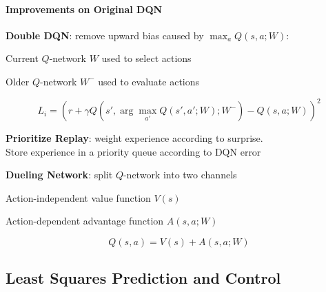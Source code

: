 \documentclass[10pt]{report}
\begin{document}
\paragraph{Improvements on Original DQN}
\begin{list}{}{}
	\item \textbf{Double DQN}: remove upward bias caused by $\max_a Q(s,a;W)$:
	\begin{list}{}{}
		\item Current $Q$-network $W$ used to select actions
		\item Older $Q$-network $W^-$ used to evaluate actions
	\end{list}
	$$L_i = \left(r+\gamma Q\left(s',\arg\max_{a'}Q(s',a';W);W^-\right)-Q(s,a;W)\right)^2$$
	\item \textbf{Prioritize Replay}: weight experience according to surprise.\\
	Store experience in a priority queue according to DQN error
	\item \textbf{Dueling Network}: split $Q$-network into two channels
	\begin{list}{}{}
		\item Action-independent value function $V(s)$
		\item Action-dependent advantage function $A(s,a;W)$
	\end{list}
	$$Q(s,a) = V(s) + A(s,a;W)$$
\end{list}
\subsection{Least Squares Prediction and Control}
\end{document}
